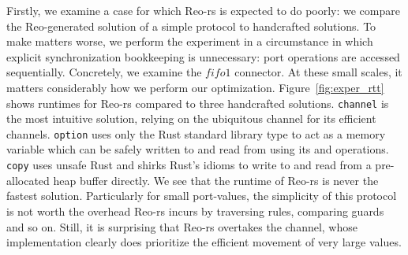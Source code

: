 Firstly, we examine a case for which Reo-rs is expected to do poorly: we compare the Reo-generated solution of a simple protocol to handcrafted solutions. To make matters worse, we perform the experiment in a circumstance in which explicit synchronization bookkeeping is unnecessary: port operations are accessed sequentially.
Concretely, we examine the $fifo1$ connector. At these small scales, it matters considerably how we perform our optimization. Figure~\ref{fig:exper_rtt} shows runtimes for Reo-rs compared to three handcrafted solutions. \texttt{channel} is the most intuitive solution, relying on the ubiquitous  channel for its efficient channels. \texttt{option} uses only the Rust standard library type  to act as a memory variable which can be safely written to and read from using its  and  operations. \texttt{copy} uses unsafe Rust and shirks Rust's idioms to write to and read from a pre-allocated heap buffer directly. We see that the runtime of Reo-rs is never the fastest solution. Particularly for small port-values, the simplicity of this protocol is not worth the overhead Reo-rs incurs by traversing rules, comparing guards and so on. Still, it is surprising that Reo-rs overtakes the  channel, whose implementation clearly does prioritize the efficient movement of very large values.

